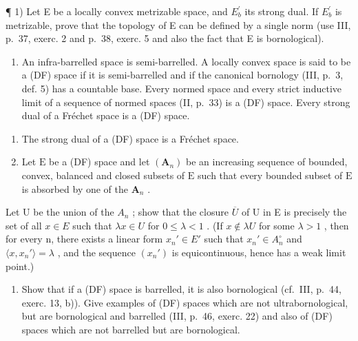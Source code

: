 \exercisegroup

¶ 1) Let E be a locally convex metrizable space, and \(E_{b}^{\prime}\) its strong dual. If \(E_{b}^{\prime}\) is metrizable, prove that the topology of E can be defined by a single norm (use III, p.~37, exerc. 2 and p.~38, exerc. 5 and also the fact that E is bornological).

\begin{enumerate}
\def\labelenumi{\arabic{enumi})}
\setcounter{enumi}{1}
\tightlist
\item
  An infra-barrelled space is semi-barrelled. A locally convex space is said to be a (DF) space if it is semi-barrelled and if the canonical bornology (III, p.~3, def. 5) has a countable base. Every normed space and every strict inductive limit of a sequence of normed spaces (II, p.~33) is a (DF) space. Every strong dual of a Fréchet space is a (DF) space.
\end{enumerate}

\begin{enumerate}
\def\labelenumi{\alph{enumi})}
\item
  The strong dual of a (DF) space is a Fréchet space.
\item
  Let \(\mathrm{E}\) be a (DF) space and let \((\mathbf{A}_n)\) be an increasing sequence of bounded, convex, balanced and closed subsets of \(\mathrm{E}\) such that every bounded subset of \(\mathrm{E}\) is absorbed by one of the \(\mathbf{A}_n\) .
\end{enumerate}

Let U be the union of the \(A_{n}\) ; show that the closure \(\overline{U}\) of U in E is precisely the set of all \(x \in E\) such that \(\lambda x \in U\) for \(0 \leqslant \lambda < 1\) . (If \(x \notin \lambda U\) for some \(\lambda > 1\) , then for every n, there exists a linear form \(x_{n}' \in E'\) such that \(x_{n}' \in A_{n}^{\circ}\) and \(\langle x, x_{n}' \rangle = \lambda\) , and the sequence \((x_{n}')\) is equicontinuous, hence has a weak limit point.)

\begin{enumerate}
\def\labelenumi{\alph{enumi})}
\setcounter{enumi}{2}
\tightlist
\item
  Show that if a (DF) space is barrelled, it is also bornological (cf.~III, p.~44, exerc. 13, b)). Give examples of (DF) spaces which are not ultrabornological, but are bornological and barrelled (III, p.~46, exerc. 22) and also of (DF) spaces which are not barrelled but are bornological.
\end{enumerate}

